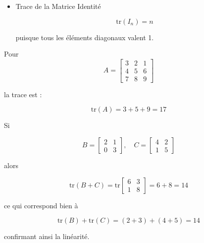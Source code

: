 \begin{appendices}
\begin{property}
\begin{itemize}
            \item Trace de la Matrice Identité

                \[
                    \text{tr}(I_n) = n
                \]

                puisque tous les éléments diagonaux valent 1.
       \end{itemize} 
    \end{property}
    \begin{eg}
        Pour
        \[
            A = \begin{bmatrix} 3 & 2 & 1 \\ 4 & 5 & 6 \\ 7 & 8 & 9 \end{bmatrix}
        \]

        la trace est :

        \[
            \text{tr}(A) = 3 + 5 + 9 = 17
        \] 
    \end{eg}
    \begin{eg}
        Si

        \[
            B = \begin{bmatrix} 2 & 1 \\ 0 & 3 \end{bmatrix}, \quad C = \begin{bmatrix} 4 & 2 \\ 1 & 5 \end{bmatrix}
        \]

        alors

        \[
            \text{tr}(B + C) = \text{tr} \begin{bmatrix} 6 & 3 \\ 1 & 8 \end{bmatrix} = 6 + 8 = 14
        \]

        ce qui correspond bien à 

        \[
            \text{tr}(B) + \text{tr}(C) = (2+3) + (4+5) = 14
        \]

        confirmant ainsi la linéarité. 
    \end{eg}
\end{appendices}
